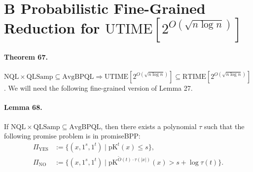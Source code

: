 \section*{B Probabilistic Fine-Grained Reduction for $\mathrm{UTIME}[2^{O(\sqrt{n\log n})}]$}
\paragraph{Theorem 67.} $\mathrm{NQL}\times\mathrm{QLSamp}\subseteq\mathrm{AvgBPQL}\Longrightarrow\mathrm{UTIME}[2^{O(\sqrt{n\log n})}]\subseteq\mathrm{RTIME}[2^{O(\sqrt{n\log n})}]$.
We will need the following fine-grained version of Lemma 27.
\paragraph{Lemma 68.} If $\mathrm{NQL}\times\mathrm{QLSamp}\subseteq\mathrm{AvgBPQL}$, then there exists a polynomial $\tau$ such that the following promise problem is in promiseBPP:
\begin{align*}
\Pi_{\mathrm{YES}}&:=\{(x,1^s,1^t)\mid\mathrm{pK}^t(x)\leq s\},\\
\Pi_{\mathrm{NO}}&:=\{(x,1^s,1^t)\mid\mathrm{pK}^{\widetilde O(t)\cdot\tau(|x|)}(x)>s+\log\tau(t)\}.
\end{align*}
